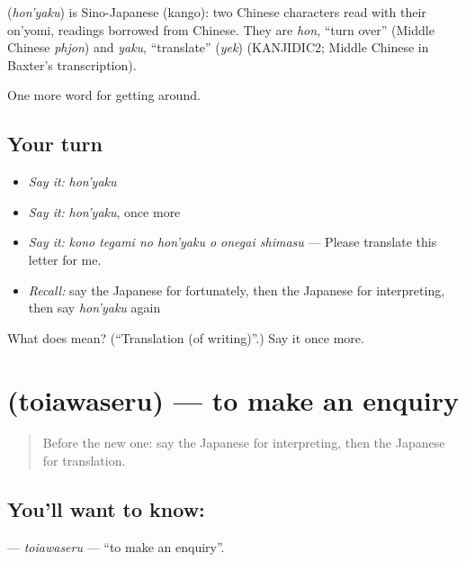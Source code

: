 \begin{cousinweb}
\textbf{} (\emph{hon'yaku}) is Sino-Japanese (kango): two Chinese characters read with their on'yomi, readings borrowed from Chinese. They are \emph{hon}, \textquotedblleft{}turn over\textquotedblright{} (Middle Chinese \emph{phjon}) and \emph{yaku}, \textquotedblleft{}translate\textquotedblright{} (\emph{yek}) (KANJIDIC2; Middle Chinese in Baxter's transcription).
\end{cousinweb}

\begin{grammarlens}[title={What you've built}]
One more word for getting around.
\end{grammarlens}

\subsection*{Your turn}
\begin{itemize}
\raggedright
  \item \emph{Say it:} \emph{hon'yaku}
  \item \emph{Say it:} \emph{hon'yaku}, once more
  \item \emph{Say it:} \emph{kono tegami no hon'yaku o onegai shimasu} — Please translate this letter for me.
  \item \emph{Recall:} say the Japanese for fortunately, then the Japanese for interpreting, then say \emph{hon'yaku} again
\end{itemize}

\begin{tcolorbox}[breakable,colback=teal!4,colframe=teal!35!black,title={Before you move on}]
What does  mean? (\textquotedblleft{}Translation (of writing)\textquotedblright{}.) Say it once more.
\end{tcolorbox}
\section[\texorpdfstring{\ja{といあわせる} (toiawaseru)}{といあわせる (toiawaseru)}]{ (toiawaseru) — to make an enquiry}

\label{lesson:JA-C425-toiawaseru}



\begin{quote}
Before the new one: say the Japanese for interpreting, then the Japanese for translation.
\end{quote}

\subsection*{You'll want to know: }
\textbf{} — \emph{toiawaseru} — \textquotedblleft{}to make an enquiry\textquotedblright{}.

